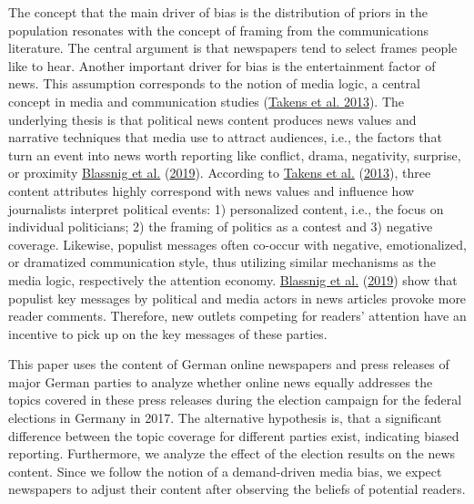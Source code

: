 \documentclass[
  12pt,
]{article}
\begin{document}
The concept that the main driver of bias is the distribution of priors
in the population resonates with the concept of framing from the
communications literature. The central argument is that newspapers tend
to select frames people like to hear. Another important driver for bias
is the entertainment factor of news. This assumption corresponds to the
notion of media logic, a central concept in media and communication
studies (\protect\hyperlink{ref-takens_media_2013}{Takens et al. 2013}).
The underlying thesis is that political news content produces news
values and narrative techniques that media use to attract audiences,
i.e., the factors that turn an event into news worth reporting like
conflict, drama, negativity, surprise, or proximity
\protect\hyperlink{ref-blassnig_hitting_2019}{Blassnig et al.}
(\protect\hyperlink{ref-blassnig_hitting_2019}{2019}). According to
\protect\hyperlink{ref-takens_media_2013}{Takens et al.}
(\protect\hyperlink{ref-takens_media_2013}{2013}), three content
attributes highly correspond with news values and influence how
journalists interpret political events: 1) personalized content, i.e.,
the focus on individual politicians; 2) the framing of politics as a
contest and 3) negative coverage. Likewise, populist messages often
co-occur with negative, emotionalized, or dramatized communication
style, thus utilizing similar mechanisms as the media logic,
respectively the attention economy.
\protect\hyperlink{ref-blassnig_hitting_2019}{Blassnig et al.}
(\protect\hyperlink{ref-blassnig_hitting_2019}{2019}) show that populist
key messages by political and media actors in news articles provoke more
reader comments. Therefore, new outlets competing for readers' attention
have an incentive to pick up on the key messages of these parties.

This paper uses the content of German online newspapers and press
releases of major German parties to analyze whether online news equally
addresses the topics covered in these press releases during the election
campaign for the federal elections in Germany in 2017. The alternative
hypothesis is, that a significant difference between the topic coverage
for different parties exist, indicating biased reporting. Furthermore,
we analyze the effect of the election results on the news content. Since
we follow the notion of a demand-driven media bias, we expect newspapers
to adjust their content after observing the beliefs of potential
readers.
\end{document}

